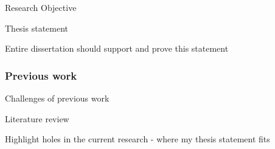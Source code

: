 \begin{frame}[t]{Research Objective}
    
    Thesis statement

    Entire dissertation should support and prove this statement

\end{frame}

\begin{frame}[t]\frametitle{Previous work}
    
    Challenges of previous work

    Literature review

    Highlight holes in the current research - where my thesis statement fits

\end{frame}